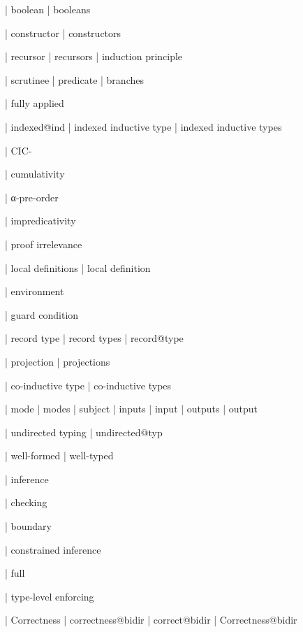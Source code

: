   | boolean
  | booleans

  | constructor
  | constructors

  | recursor
  | recursors
  | induction principle

  | scrutinee
  | predicate
  | branches

  | fully applied

  | indexed@ind
  | indexed inductive type
  | indexed inductive types

  | CIC-

  | cumulativity

  | α-pre-order

  | impredicativity

  | proof irrelevance

  | local definitions
  | local definition

  | environment

  | guard condition

  | record type
  | record types
  | record@type

  | projection
  | projections

  | co-inductive type
  | co-inductive types


  | mode
  | modes
  | subject
  | inputs
  | input
  | outputs
  | output

  | undirected typing
  | undirected@typ


  | well-formed
  | well-typed

  | inference

  | checking

  | boundary

  | constrained inference

  | full

  | type-level enforcing

  | Correctness
  | correctness@bidir
  | correct@bidir
  | Correctness@bidir

